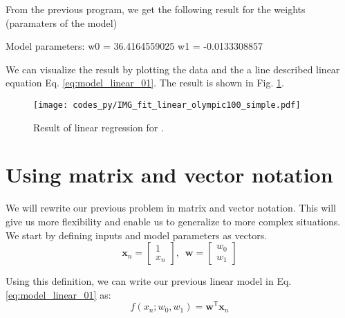 From the previous program, we get the following result
for the weights (paramaters of the model)
\begin{textcode}
Model parameters:
w0 =      36.4164559025
w1 =      -0.0133308857
\end{textcode}

We can visualize the result by plotting the data and the a line described
linear equation Eq. \eqref{eq:model_linear_01}. The result is shown in
Fig. \ref{fig:linreg_01}.
\begin{figure}[h]
\begin{center}
\texttt{[image: codes\_py/IMG\_fit\_linear\_olympic100\_simple.pdf]}
\end{center}
\caption{Result of linear regression for .}
\label{fig:linreg_01}
\end{figure}


\section{Using matrix and vector notation}

We will rewrite our previous problem in matrix and vector notation. This will
give us more flexibility and enable us to generalize to more complex situations.
We start by defining inputs and model parameters as vectors.
\begin{equation*}
\mathbf{x}_{n} = \begin{bmatrix}
1 \\
x_{n}
\end{bmatrix}
,\,\,\,%
\mathbf{w} = \begin{bmatrix}
w_{0} \\
w_{1}
\end{bmatrix}
\end{equation*}

Using this definition, we can write our previous linear model in Eq.
\eqref{eq:model_linear_01} as:
\begin{equation}
f(x_n; w_0, w_1) = \mathbf{w}^{\mathsf{T}} \mathbf{x}_{n}
\label{eq:model_linear_02}
\end{equation}

